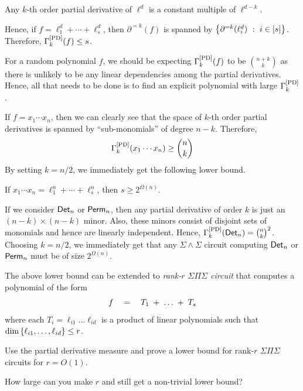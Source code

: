 \begin{observation}\label{obs:low-rank-sps-rank}
Any $k$-th order partial derivative of $\ell^d$ is a constant multiple of $\ell^{d-k}$. 
\end{observation}

Hence, if $f = \ell_1^d + \cdots + \ell_s^d$, then $\partial^{=k}(f)$ is spanned by $\left\{{\partial^{=k}(\ell_i^d)}\ : \ {i\in [s]}\right\}$. Therefore, $\Gamma^{\mathrm{[PD]}}_k(f) \leq s$. 

For a random polynomial $f$, we should be expecting $\Gamma^{\mathrm{[PD]}}_k(f)$ to be $\binom{n+k}{k}$ as there is unlikely to be any linear dependencies among the partial derivatives. 
Hence, all that needs to be done is to find an explicit polynomial with large $\Gamma^{\mathrm{[PD]}}_k$. 

If $f = x_1 \cdots x_n$, then we can clearly see that the space of $k$-th order partial derivatives is spanned by ``sub-monomials'' of degree $n-k$. Therefore, 
\[
\Gamma^{\mathrm{[PD]}}_k(x_1 \cdots x_n) \geq \binom{n}{k}
\]
By setting $k = n/2$, we immediately get the following lower bound. 

\begin{corollary}
  If $x_1\cdots x_n = \ell_1^n + \cdots + \ell_s^n$, then $s \geq 2^{\Omega(n)}$. 
\end{corollary}

If we consider $\operatorname{\mathsf{Det}}_n$ or $\operatorname{\mathsf{Perm}}_n$, then any partial derivative of order $k$ is just an $(n-k)\times(n-k)$ minor. 
Also, these minors consist of disjoint sets of monomials and hence are linearly independent. 
Hence, $\Gamma^{\mathrm{[PD]}}_k(\operatorname{\mathsf{Det}}_n) = \binom{n}{k}^2$. 
Choosing $k = n/2$, we immediately get that any $\Sigma\!\wedge\!\Sigma$ circuit computing $\operatorname{\mathsf{Det}}_n$ or $\operatorname{\mathsf{Perm}}_n$ must be of size $2^{\Omega(n)}$. 

\begin{exercise}
The above lower bound can be extended to \emph{rank-$r$ $\Sigma\Pi\Sigma$ circuit} that computes a polynomial of the form 
$$
f \quad = \quad  T_1 \;+\; \dots \;+\; T_s
$$
where each $T_i = \ell_{i1}\dots \ell_{id}$ is a product of linear polynomials such that $\dim\left\{\ell_{i1},\dots, \ell_{id}\right\}\leq r$.

\medskip

Use the partial derivative measure and prove a lower bound for rank-$r$ $\Sigma\Pi\Sigma$ circuits for $r = O(1)$. 

\medskip

How large can you make $r$ and still get a non-trivial lower bound? 
\end{exercise}

